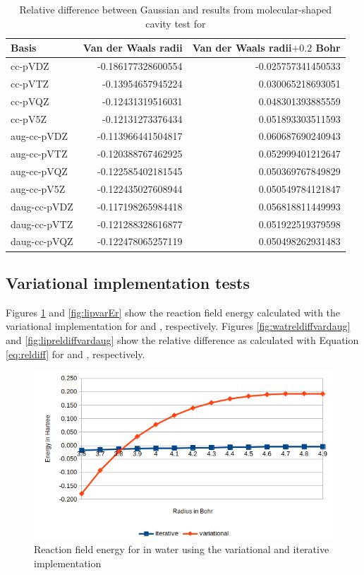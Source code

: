 \documentclass[../master_thesis.tex]{subfiles}
\begin{document}
\begin{table}[htbp]
\caption[Relative difference between Gaussian and \mrchem results for ]{Relative difference between Gaussian and \mrchem results from molecular-shaped cavity  test for }
\begin{tabular}{l|r|r}
Basis & \multicolumn{1}{l|}{Van der Waals radii} & \multicolumn{1}{l|}{Van der Waals radii$+0.2$ Bohr} \\ \hline
cc-pVDZ & -0.186177328600554 & -0.025757341450533 \\
cc-pVTZ & -0.13954657945224 & 0.030065218693051 \\
cc-pVQZ & -0.12431319516031 & 0.048301393885559 \\
cc-pV5Z & -0.12131273376434 & 0.051893303511593 \\
aug-cc-pVDZ & -0.113966441504817 & 0.060687690240943 \\
aug-cc-pVTZ & -0.120388767462925 & 0.052999401212647 \\
aug-cc-pVQZ & -0.122585402181545 & 0.050369767849829 \\
aug-cc-pV5Z & -0.122435027608944 & 0.050549784121847 \\
daug-cc-pVDZ & -0.117198265984418 & 0.056818811449993 \\
daug-cc-pVTZ & -0.121288328616877 & 0.051922519379598 \\
daug-cc-pVQZ & -0.122478065257119 & 0.050498262931483 \\
\end{tabular}
\label{tab:acetamidabcreldiff}
\end{table}
\clearpage


\subsection{Variational implementation tests}
Figures \ref{fig:watvarEr} and \ref{fig:lipvarEr} show the reaction field energy
calculated with the variational implementation for  and ,
respectively. Figures \ref{fig:watreldiffvardaug} and \ref{fig:lipreldiffvardaug} show the
relative difference as calculated with Equation \ref{eq:reldiff} for  and ,
respectively.

\begin{figure}[!htb]
  \centering
  \includegraphics[width=0.75\linewidth]{img/watvarEr.png}
  \caption{Reaction field energy for  in water using the variational and iterative implementation}
  \label{fig:watvarEr}
\end{figure}
\end{document}
